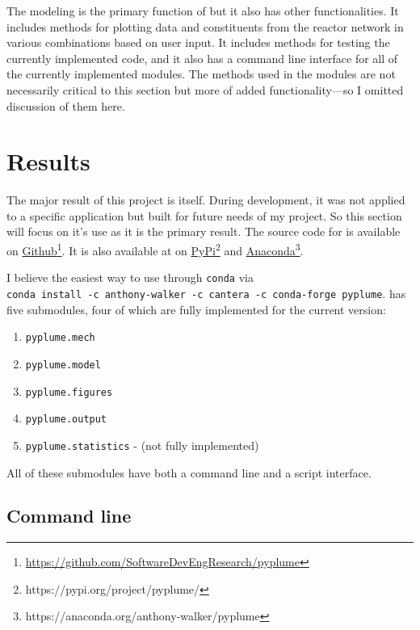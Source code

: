 \documentclass[smallextended,referee]{svjour3}
\begin{document}
The modeling is the primary function of \pyplume{} but it also has other functionalities. It includes methods for plotting data and constituents from the reactor network in various combinations based on user input. It includes methods for testing the currently implemented code, and it also has a command line interface for all of the currently implemented modules. The methods used in the modules are not necessarily critical to this section but more of added functionality---so I omitted discussion of them here.




\section{Results}
The major result of this project is \pyplume{} itself. During development, it was not applied to a specific application but built for future needs of my project. So this section will focus on it's use as it is the primary result. The source code for \pyplume{} is available on \href{https://github.com/SoftwareDevEngResearch/pyplume}{Github}\footnote{\url{https://github.com/SoftwareDevEngResearch/pyplume}}. It is also available at on \href{https://pypi.org/project/pyplume/}{PyPi}\footnote{https://pypi.org/project/pyplume/} and \href{https://anaconda.org/anthony-walker/pyplume}{Anaconda}\footnote{https://anaconda.org/anthony-walker/pyplume}.

I believe the easiest way to use \pyplume{} through \texttt{conda} via
\\
\noindent
\texttt{conda install -c anthony-walker -c cantera -c conda-forge pyplume}.
\pyplume{} has five submodules, four of which are fully implemented for the current version:
\begin{enumerate}[noitemsep,topsep=0pt]
    \item \texttt{pyplume.mech}
    \item \texttt{pyplume.model}
    \item \texttt{pyplume.figures}
    \item \texttt{pyplume.output}
    \item \texttt{pyplume.statistics} - (not fully implemented)
\end{enumerate}
\noindent
All of these submodules have both a command line and a script interface.

\subsection{\textbf{Command line}}
\end{document}
